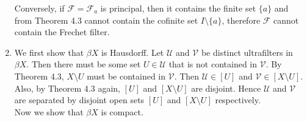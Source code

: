 \documentclass{article}
\begin{document}
\begin{enumerate}
    Conversely, if $\mathcal{F}=\mathcal{F}_a$ is principal, then it
    contains the finite set $\{a\}$ and from Theorem 4.3 cannot contain the
    cofinite set $I\setminus\{a\}$, therefore $\mathcal{F}$ cannot contain
    the Frechet filter.

  \item We first show that $\beta X$ is Hausdorff. Let $\mathcal{U}$ and
    $\mathcal{V}$ be distinct ultrafilters in $\beta X$. Then there must be
    some set $U\in\mathcal{U}$ that is not contained in $\mathcal{V}$. By
    Theorem 4.3, $X\setminus U$ must be contained in $\mathcal{V}$. Then
    $\mathcal{U}\in[U]$ and $\mathcal{V}\in[X\setminus U]$. Also, by
    Theorem 4.3 again, $[U]$ and $[X\setminus U]$ are disjoint. Hence
    $\mathcal{U}$ and $\mathcal{V}$ are separated by disjoint open sets
    $[U]$ and $[X\setminus U]$ respectively. \\

    Now we show that $\beta X$ is compact.
\end{enumerate}
\end{document}
